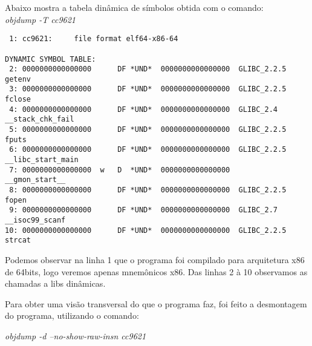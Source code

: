Abaixo mostra a tabela dinâmica de símbolos obtida com o comando:\\
\emph{objdump -T cc9621}

\begin{verbatim}
 1: cc9621:     file format elf64-x86-64

DYNAMIC SYMBOL TABLE:
 2: 0000000000000000      DF *UND*	0000000000000000  GLIBC_2.2.5 getenv
 3: 0000000000000000      DF *UND*	0000000000000000  GLIBC_2.2.5 fclose
 4: 0000000000000000      DF *UND*	0000000000000000  GLIBC_2.4   __stack_chk_fail
 5: 0000000000000000      DF *UND*	0000000000000000  GLIBC_2.2.5 fputs
 6: 0000000000000000      DF *UND*	0000000000000000  GLIBC_2.2.5 __libc_start_main
 7: 0000000000000000  w   D  *UND*	0000000000000000              __gmon_start__
 8: 0000000000000000      DF *UND*	0000000000000000  GLIBC_2.2.5 fopen
 9: 0000000000000000      DF *UND*	0000000000000000  GLIBC_2.7   __isoc99_scanf
10: 0000000000000000      DF *UND*	0000000000000000  GLIBC_2.2.5 strcat
\end{verbatim}

Podemos observar na linha 1 que o programa foi compilado para
arquitetura x86 de 64bits, logo veremos apenas mnemônicos x86. Das
linhas 2 à 10 observamos as chamadas a libs dinâmicas.

Para obter uma visão transversal do que o programa faz, foi feito a
desmontagem do programa, utilizando o comando:

\emph{objdump -d --no-show-raw-insn cc9621}


